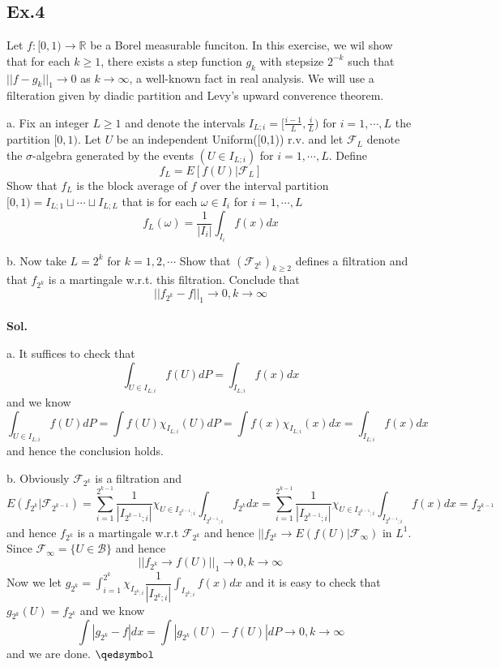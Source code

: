 \documentclass[lang=en,11pt,a4paper,citestyle =authoryear]{elegantpaper}
\newcommand{\prvd}{$\hfill \qedsymbol$}
\newcommand{\R}{\mathbb{R}}
\newcommand{\F}{\mathcal{F}}
\begin{document}
\subsection*{Ex.4} 
Let $f:[0,1)\to\R$ be a Borel measurable funciton. In this exercise, we wil show that for each $k\geq 1$, there exists a step function $g_k$ with stepsize $2^{-k}$ such that $||f-g_k||_1\to 0$ as $k\to\infty$, a well-known fact in real analysis. We will use a filteration given by diadic partition and Levy's upward converence theorem.\par
a. Fix an integer $L\geq 1$ and denote the intervals $I_{L;i} = [\tfrac{i-1}{L},\tfrac{i}{L})$ for $i=1,\cdots,L$ the partition $[0,1)$. Let $U$ be an independent Uniform([0,1)) r.v. and let $\F_L$ denote the $\sigma$-algebra generated by the events $(U\in I_{L;i})$ for $i=1,\cdots,L$. Define
\[f_L = E[f(U)|\F_L]\]
Show that $f_L$ is the block average of $f$ over the interval partition $[0,1) = I_{L;1}\sqcup \cdots \sqcup I_{L;L}$ that is for each $\omega \in I_i$ for $i = 1,\cdots,L$
\[f_L(\omega) = \dfrac{1}{|I_i|}\int_{I_i} f(x)dx\]\par
b. Now take $L=2^k$ for $k=1,2,\cdots$ Show that $(\F_{2^k})_{k\geq 2}$ defines a filtration and that $f_{2^k}$ is a martingale w.r.t. this filtration. Conclude that
\[||f_{2^k}-f||_1 \to 0, k\to\infty\]
\vspace{0.5em}\\
\textbf{Sol.} \par
a. It suffices to check that
\[\int_{U\in I_{L;i}} f(U) dP = \int_{I_{L;i}} f(x)dx\]
and we know
\[
\int_{U\in I_{L;i}} f(U) dP = \int f(U)\chi_{I_{L;i}}(U) dP = \int f(x)\chi_{I_{L;i}}(x) dx = \int_{I_{L;i}} f(x)dx
\]
and hence the conclusion holds.\par

b. Obviously $\F_{2^k}$ is a filtration and
\[E(f_{2^k}|\F_{2^{k-1}}) = \sum\limits_{i=1}^{2^{k-1}} \dfrac{1}{|I_{2^{k-1};i}|} \chi_{U\in I_{2^{k-1};i}}\int_{I_{2^{k-1};i}} f_{2^k}dx = \sum\limits_{i=1}^{2^{k-1}} \dfrac{1}{|I_{2^{k-1};i}|} \chi_{U\in I_{2^{k-1};i}}\int_{I_{2^{k-1};i}} f(x)dx = f_{2^{k-1}}\]
and hence $f_{2^k}$ is a martingale w.r.t $\F_{2^k}$ and hence
$||f_{2^k} \to E(f(U)|\F_{\infty})$ in $L^1$. Since $\F_{\infty} = \{U\in\mathcal{B}\}$ and hence
\[||f_{2^k} \to f(U)||_1 \to 0, k\to\infty\]
Now we let $g_{2^k} = \int_{i=1}^{2^k} \chi_{I_{2^k;i}}\dfrac{1}{|I_{2^k;i}|}\int_{I_{2^k;i}}f(x)dx$ and it is easy to check that $g_{2^k}(U) = f_{2^k}$ and we know
\[
\int|g_{2^k} - f| dx = \int|g_{2^k}(U) - f(U)|dP \to 0, k\to\infty
\]
and we are done.
\prvd
\vspace{0.5em}
\end{document}
